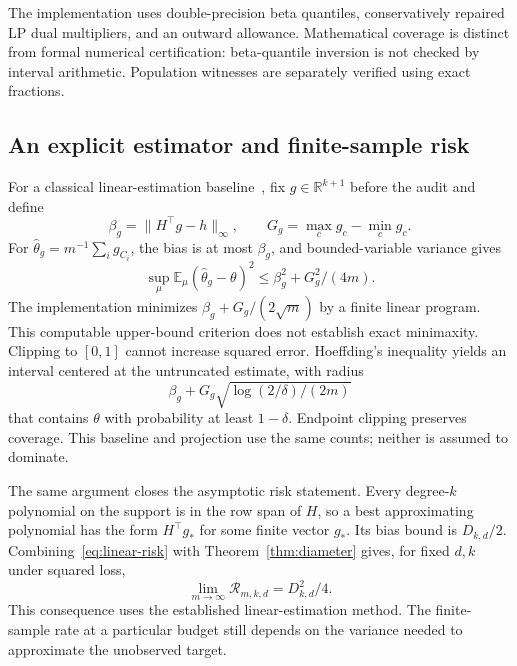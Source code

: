 \documentclass[conference]{IEEEtran}
\newcommand{\E}{\mathbb{E}}
\begin{document}
The implementation uses double-precision beta quantiles, conservatively repaired LP dual multipliers, and an outward allowance. Mathematical coverage is distinct from formal numerical certification: beta-quantile inversion is not checked by interval arithmetic. Population witnesses are separately verified using exact fractions.

\subsection{An explicit estimator and finite-sample risk}
For a classical linear-estimation baseline~\cite{polyanskiy}, fix $g\in\mathbb R^{k+1}$ before the audit and define
\begin{equation}
 \beta_g=\|H^\top g-h\|_\infty,\qquad
 G_g=\max_c g_c-\min_c g_c.
\end{equation}
For $\widehat\theta_g=m^{-1}\sum_i g_{C_i}$, the bias is at most $\beta_g$, and bounded-variable variance gives
\begin{equation}\label{eq:linear-risk}
 \sup_\mu\E_\mu(\widehat\theta_g-\theta)^2
 \leq \beta_g^2+G_g^2/(4m).
\end{equation}
The implementation minimizes $\beta_g+G_g/(2\sqrt m)$ by a finite linear program. This computable upper-bound criterion does not establish exact minimaxity. Clipping to $[0,1]$ cannot increase squared error. Hoeffding's inequality yields an interval centered at the untruncated estimate, with radius
\begin{equation}\label{eq:linear-ci}
 \beta_g+G_g\sqrt{\log(2/\delta)/(2m)}
\end{equation}
that contains $\theta$ with probability at least $1-\delta$. Endpoint clipping preserves coverage. This baseline and projection use the same counts; neither is assumed to dominate.

The same argument closes the asymptotic risk statement. Every degree-$k$ polynomial on the support is in the row span of $H$, so a best approximating polynomial has the form $H^\top g_*$ for some finite vector $g_*$. Its bias bound is $D_{k,d}/2$. Combining~\eqref{eq:linear-risk} with Theorem~\ref{thm:diameter} gives, for fixed $d,k$ under squared loss,
\begin{equation}
 \lim_{m\to\infty}\mathcal R_{m,k,d}=D_{k,d}^2/4.
\end{equation}
This consequence uses the established linear-estimation method. The finite-sample rate at a particular budget still depends on the variance needed to approximate the unobserved target.
\end{document}
